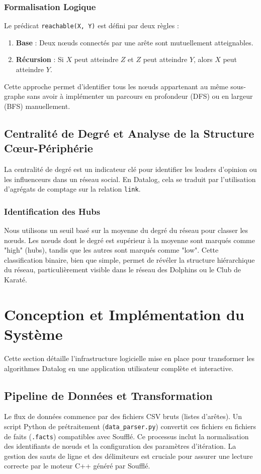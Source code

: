 \documentclass[12pt,a4paper]{report}
\begin{document}
\subsection{Formalisation Logique}
Le prédicat \texttt{reachable(X, Y)} est défini par deux règles :
\begin{enumerate}
    \item \textbf{Base} : Deux nœuds connectés par une arête sont mutuellement atteignables.
    \item \textbf{Récursion} : Si $X$ peut atteindre $Z$ et $Z$ peut atteindre $Y$, alors $X$ peut atteindre $Y$.
\end{enumerate}
Cette approche permet d'identifier tous les nœuds appartenant au même sous-graphe sans avoir à implémenter un parcours en profondeur (DFS) ou en largeur (BFS) manuellement.

\section{Centralité de Degré et Analyse de la Structure Cœur-Périphérie}
La centralité de degré est un indicateur clé pour identifier les leaders d'opinion ou les influenceurs dans un réseau social. En Datalog, cela se traduit par l'utilisation d'agrégats de comptage sur la relation \texttt{link}.

\subsection{Identification des Hubs}
Nous utilisons un seuil basé sur la moyenne du degré du réseau pour classer les nœuds. Les nœuds dont le degré est supérieur à la moyenne sont marqués comme "high" (hubs), tandis que les autres sont marqués comme "low". Cette classification binaire, bien que simple, permet de révéler la structure hiérarchique du réseau, particulièrement visible dans le réseau des Dolphins ou le Club de Karaté.

\chapter{Conception et Implémentation du Système}
Cette section détaille l'infrastructure logicielle mise en place pour transformer les algorithmes Datalog en une application utilisateur complète et interactive.

\section{Pipeline de Données et Transformation}
Le flux de données commence par des fichiers CSV bruts (listes d'arêtes). Un script Python de prétraitement (\texttt{data\_parser.py}) convertit ces fichiers en fichiers de faits (\texttt{.facts}) compatibles avec Soufflé. Ce processus inclut la normalisation des identifiants de nœuds et la configuration des paramètres d'itération. La gestion des sauts de ligne et des délimiteurs est cruciale pour assurer une lecture correcte par le moteur C++ généré par Soufflé.
\end{document}
